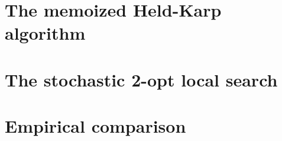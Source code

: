 \documentclass[10pt]{extarticle}
\begin{document}
\section{The memoized Held-Karp algorithm}

\section{The stochastic 2-opt local search}

\section{Empirical comparison}
\end{document}
